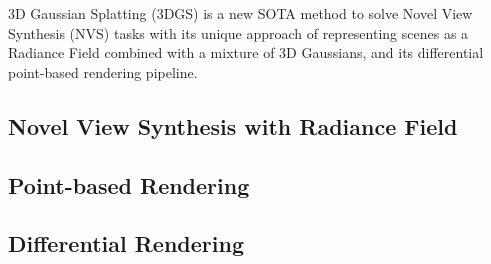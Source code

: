 3D Gaussian Splatting\cite{kerbl3DGaussianSplatting2023} (3DGS) 
is a new SOTA method to solve Novel View Synthesis (NVS) tasks 
with its unique approach of representing scenes as a Radiance Field combined with a mixture of 3D Gaussians,
and its differential point-based rendering pipeline.

\subsection{Novel View Synthesis with Radiance Field}



\subsection{Point-based Rendering}



\subsection{Differential Rendering}

